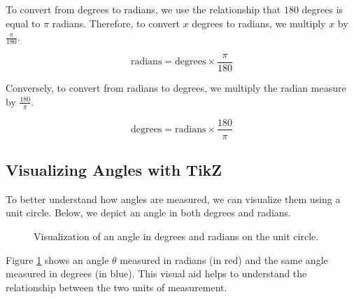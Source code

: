 \documentclass[a4paper,12pt]{book}
\begin{document}
To convert from degrees to radians, we use the relationship that \(180\) degrees is equal to \(\pi\) radians. Therefore, to convert \(x\) degrees to radians, we multiply \(x\) by \(\frac{\pi}{180}\).

\[
\text{radians} = \text{degrees} \times \frac{\pi}{180}
\]

Conversely, to convert from radians to degrees, we multiply the radian measure by \(\frac{180}{\pi}\).

\[
\text{degrees} = \text{radians} \times \frac{180}{\pi}
\]

\subsection{Visualizing Angles with TikZ}
\label{subsec:visualizing_angles}

To better understand how angles are measured, we can visualize them using a unit circle. Below, we depict an angle in both degrees and radians.

\begin{figure}[ht!]
\centering
{}
\caption{Visualization of an angle in degrees and radians on the unit circle.}
\label{fig:angles_visualization}
\end{figure}

Figure \ref{fig:angles_visualization} shows an angle $\theta$ measured in radians (in red) and the same angle measured in degrees (in blue). This visual aid helps to understand the relationship between the two units of measurement.

\end{document}
